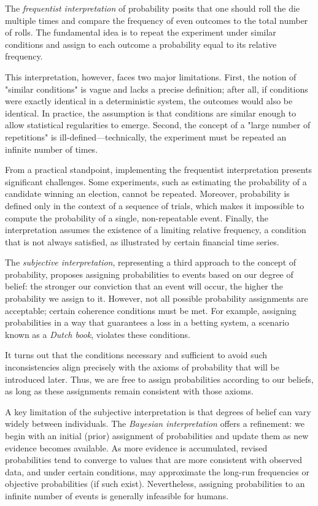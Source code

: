 The \emph{frequentist interpretation} of probability posits that one should roll the die multiple times and compare the frequency of even outcomes to the total number of rolls. The fundamental idea is to repeat the experiment under similar conditions and assign to each outcome a probability equal to its relative frequency.

This interpretation, however, faces two major limitations. First, the notion of "similar conditions" is vague and lacks a precise definition; after all, if conditions were exactly identical in a deterministic system, the outcomes would also be identical. In practice, the assumption is that conditions are similar enough to allow statistical regularities to emerge. Second, the concept of a "large number of repetitions" is ill-defined—technically, the experiment must be repeated an infinite number of times.

From a practical standpoint, implementing the frequentist interpretation presents significant challenges. Some experiments, such as estimating the probability of a candidate winning an election, cannot be repeated. Moreover, probability is defined only in the context of a sequence of trials, which makes it impossible to compute the probability of a single, non-repeatable event. Finally, the interpretation assumes the existence of a limiting relative frequency, a condition that is not always satisfied, as illustrated by certain financial time series.

The \emph{subjective interpretation}, representing a third approach to the concept of probability, proposes assigning probabilities to events based on our degree of belief: the stronger our conviction that an event will occur, the higher the probability we assign to it. However, not all possible probability assignments are acceptable; certain coherence conditions must be met. For example, assigning probabilities in a way that guarantees a loss in a betting system, a scenario known as a \emph{Dutch book}, violates these conditions.

It turns out that the conditions necessary and sufficient to avoid such inconsistencies align precisely with the axioms of probability that will be introduced later. Thus, we are free to assign probabilities according to our beliefs, as long as these assignments remain consistent with those axioms.

A key limitation of the subjective interpretation is that degrees of belief can vary widely between individuals. The \emph{Bayesian interpretation} offers a refinement: we begin with an initial (prior) assignment of probabilities and update them as new evidence becomes available. As more evidence is accumulated, revised probabilities tend to converge to values that are more consistent with observed data, and under certain conditions, may approximate the long-run frequencies or objective probabilities (if such exist). Nevertheless, assigning probabilities to an infinite number of events is generally infeasible for humans.

